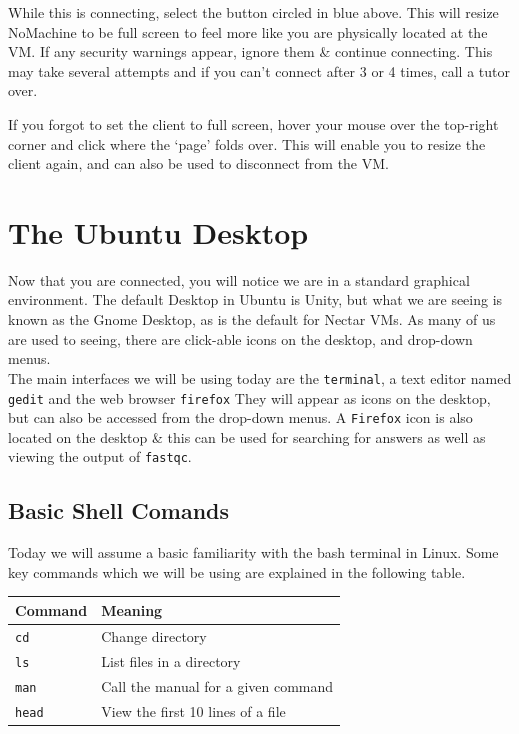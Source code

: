 \begin{warning}
While this is connecting, select the button circled in blue above.
This will resize NoMachine to be full screen to feel more like you are physically located at the VM.
If any security warnings appear, ignore them \& continue connecting.
This may take several attempts and if you can't connect after 3 or 4 times, call a tutor over.
\end{warning}

If you forgot to set the client to full screen, hover your mouse over the top-right corner and click where the `page' folds over. 
This will enable you to resize the client again, and can also be used to disconnect from the VM.\\


\section{The Ubuntu Desktop}
\begin{note}
Now that you are connected, you will notice we are in a standard graphical environment.
The default Desktop in Ubuntu is Unity, but what we are seeing is known as the Gnome Desktop, as is the default for Nectar VMs.
As many of us are used to seeing, there are click-able icons on the desktop, and drop-down menus. \\

The main interfaces we will be using today are the \texttt{terminal}, a text editor named \texttt{gedit} and the web browser \texttt{firefox}
They will appear as icons on the desktop, but can also be accessed from the drop-down menus.
A \texttt{Firefox} icon is also located on the desktop \& this can be used for searching for answers as well as viewing the output of \texttt{fastqc}.
\end{note}

\subsection{Basic Shell Comands}
\begin{note}
Today we will assume a basic familiarity with the bash terminal in Linux.
Some key commands which we will be using are explained in the following table.
\end{note}
\begin{center}
  \begin{tabular}[h]{|p{3cm} | p{11.5cm} |}
    \hline
    \textbf{Command} & \textbf{Meaning} \\
    \hline
    \texttt{cd} & Change directory \\
    \texttt{ls} & List files in a directory \\
    \texttt{man} & Call the manual for a given command \\
    \texttt{head} & View the first 10 lines of a file \\
    \hline
  \end{tabular}
\end{center}

